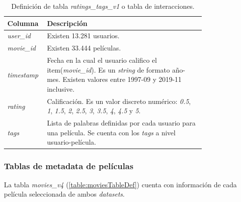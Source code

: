 \documentclass[11pt,a4paper,twoside]{thesis}
\begin{document}
\begin{table}[!htb]
	\centering
	\footnotesize
	\begin{tabular}{l | p{0.8\linewidth}}
		\hline
		Columna            & Descripción                                                                                                                                                                     \\
		\hline

		\textit{user\_id}  & Existen 13.281 usuarios.                                                                                                                                                        \\
		\textit{movie\_id} & Existen 33.444 películas.                                                                                                                                                       \\
		\textit{timestamp} & Fecha en la cual el usuario califico el item(\textit{movie\_id}). Es un \textit{string} de formato año-mes. Existen valores entre 1997-09 y 2019-11 inclusive.                  \\
		\textit{rating}    & Calificación. Es un valor discreto numérico: \textit{0.5}, \textit{1}, \textit{1.5}, \textit{2}, \textit{2.5}, \textit{3}, \textit{3.5}, \textit{4}, \textit{4.5} y \textit{5}. \\
		\textit{tags}      & Lista de palabras definidas por cada usuario para una película. Se cuenta con los \textit{tags} a nivel usuario-película.                                                       \\
		\hline
	\end{tabular}
	\caption{
		Definición de tabla \textit{ratings\_tags\_v1} o tabla de interacciones.
	}
	\label{table:interactionsTableDef}
\end{table}

\subsubsection*{Tablas de metadata de películas}

La tabla \textit{movies\_v4} (\ref{table:moviesTableDef}) cuenta con
información de cada película seleccionada de ambos \textit{datasets}.
\end{document}
